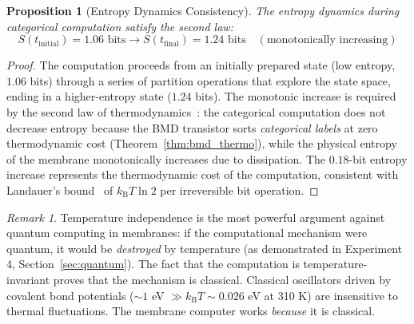\documentclass[twocolumn,10pt,a4paper]{article}
\newtheorem{proposition}[theorem]{Proposition}
\theoremstyle{definition}
\theoremstyle{remark}
\newtheorem{remark}[theorem]{Remark}
\newcommand{\kB}{k_{\mathrm{B}}}
\begin{document}
\begin{proposition}[Entropy Dynamics Consistency]
\label{prop:entropy_dynamics}
The entropy dynamics during categorical computation satisfy the second law:
\begin{equation}
\label{eq:entropy_dynamics}
S(t_{\mathrm{initial}}) = 1.06 \text{ bits} \to S(t_{\mathrm{final}}) = 1.24 \text{ bits} \quad (\text{monotonically increasing})
\end{equation}
\end{proposition}

\begin{proof}
The computation proceeds from an initially prepared state (low entropy, $1.06$ bits) through a series of partition operations that explore the state space, ending in a higher-entropy state ($1.24$ bits). The monotonic increase is required by the second law of thermodynamics~\citep{boltzmann1896vorlesungen}: the categorical computation does not decrease entropy because the BMD transistor sorts \emph{categorical labels} at zero thermodynamic cost (Theorem~\ref{thm:bmd_thermo}), while the physical entropy of the membrane monotonically increases due to dissipation. The $0.18$-bit entropy increase represents the thermodynamic cost of the computation, consistent with Landauer's bound~\citep{landauer1961irreversibility} of $\kB T \ln 2$ per irreversible bit operation. \qedhere
\end{proof}

\begin{remark}
\label{rem:quantum_unnecessary}
Temperature independence is the most powerful argument against quantum computing in membranes: if the computational mechanism were quantum, it would be \emph{destroyed} by temperature (as demonstrated in Experiment 4, Section~\ref{sec:quantum}). The fact that the computation is temperature-invariant proves that the mechanism is classical. Classical oscillators driven by covalent bond potentials ($\sim 1$ eV $\gg \kB T \sim 0.026$ eV at 310 K) are insensitive to thermal fluctuations. The membrane computer works \emph{because} it is classical.
\end{remark}
\end{document}
